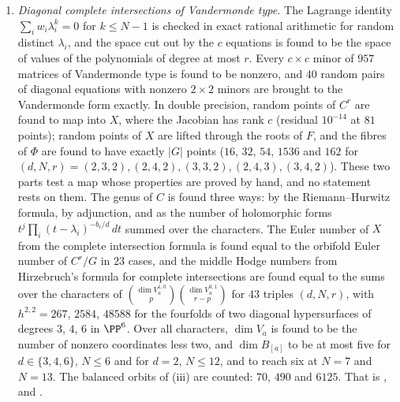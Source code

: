 \begin{enumerate}[label=\textup{(\Roman*)},leftmargin=*]
  the two terms reversed, and at $t=(2,5,7)$. Each piece is found to
  have $3$, $6$, $7$ partners of the other parity differing in one, two,
  three coordinates, the last with $D=16$ six times and $64$ once. In the
  explicit convolution the $112$ groups $\cH^{3}$ of pieces that differ
  everywhere, $2560$ classes, are found to be reached by no element of
  degree one and to have no target of degree three, and the same is found
  for every such pair with adjacent shifts in $36$ random orders and shifts
  of the three placements of . That is
  , ,
   and ; the ranks of (G)
  and (H) are not used in the paper.

\item \emph{Diagonal complete intersections of Vandermonde type.} The
  Lagrange identity $\sum_{i}w_{i}\lambda_{i}^{k}=0$ for $k\le N-1$ is checked
  in exact rational arithmetic for random distinct $\lambda_{i}$, and the
  space cut out by the $c$ equations is found to be the space of values of
  the polynomials of degree at most $r$. Every $c\times c$ minor of $957$
  matrices of Vandermonde type is found to be nonzero, and $40$ random pairs
  of diagonal equations with nonzero $2\times2$ minors are brought to the
  Vandermonde form exactly. In double precision, random points of $C^{r}$
  are found to map into $X$, where the Jacobian has rank $c$ (residual
  $10^{-14}$ at $81$ points); random points of $X$ are lifted through the
  roots of $F$, and the fibres of $\Phi$ are found to have exactly $|G|$
  points ($16$, $32$, $54$, $1536$ and $162$ for
  $(d,N,r)=(2,3,2),(2,4,2),(3,3,2),(2,4,3),(3,4,2)$). These two parts test
  a map whose properties are proved by hand, and no statement rests on
  them. The genus of $C$ is found three ways: by the Riemann--Hurwitz formula,
  by adjunction, and as the number of holomorphic forms
  $t^{j}\prod_{i}(t-\lambda_{i})^{-b_{i}/d}\,dt$ summed over the characters.
  The Euler number of $X$ from the complete intersection formula is found
  equal to the orbifold Euler number of $C^{r}/G$ in $23$ cases, and the
  middle Hodge numbers from Hirzebruch's formula for complete intersections
  are found equal to the sums over the characters of
  $\binom{\dim V_{a}^{1,0}}{p}\binom{\dim V_{a}^{0,1}}{r-p}$ for $43$ triples
  $(d,N,r)$, with $h^{2,2}=267$, $2584$, $48588$ for the fourfolds of two
  diagonal hypersurfaces of degrees $3$, $4$, $6$ in $\PP^{6}$. Over all
  characters, $\dim V_{a}$ is found to be the number of nonzero coordinates
  less two, and $\dim B_{[a]}$ to be at most five for $d\in\{3,4,6\}$,
  $N\le6$ and for $d=2$, $N\le12$, and to reach six at $N=7$ and $N=13$. The balanced orbits of
  (iii) are counted: $70$, $490$ and $6125$. That is
  ,  and
  .


\end{enumerate}

